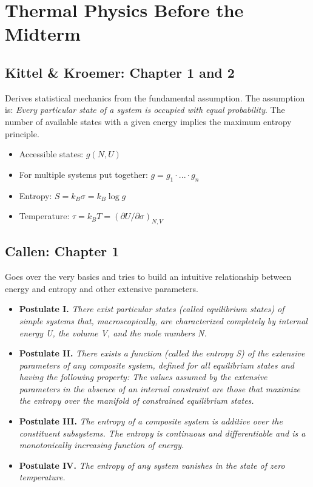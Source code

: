 
\chapter{Thermal Physics Before the Midterm}

\section{Kittel \& Kroemer: Chapter 1 and 2}
Derives statistical mechanics from the fundamental assumption. The assumption is: \emph{Every particular state of a system is occupied with equal probability}. The number of available states with a given energy implies the maximum entropy principle. 
\begin{itemize}
    \item Accessible states: $g(N,U)$
    \item For multiple systems put together: $g = g_1 \cdot ... \cdot g_n$
    \item Entropy: $S=k_B \sigma = k_B \log{g}$
    \item Temperature: $\tau = k_B T = (\partial U/ \partial \sigma)_{N,V}$
\end{itemize}


\section{Callen: Chapter 1}
Goes over the very basics and tries to build an intuitive relationship between energy and entropy and other extensive parameters.
\begin{itemize}
    \item \textbf{Postulate I.} \emph{There exist particular states (called equilibrium states) of simple systems that, macroscopically, are characterized completely by internal energy U, the volume V, and the mole numbers N.}
    \item \textbf{Postulate II.} \emph{There exists a function (called the entropy S) of the extensive parameters of any composite system, defined for all equilibrium states and having the following property: The values assumed by the extensive parameters in the absence of an internal constraint are those that maximize the entropy over the manifold of constrained equilibrium states.}
    \item \textbf{Postulate III.} \emph{The entropy of a composite system is additive over the constituent subsystems. The entropy is continuous and differentiable and is a monotonically increasing function of energy.}
    \item \textbf{Postulate IV.} \emph{The entropy of any system vanishes in the state of zero temperature.}
\end{itemize}

